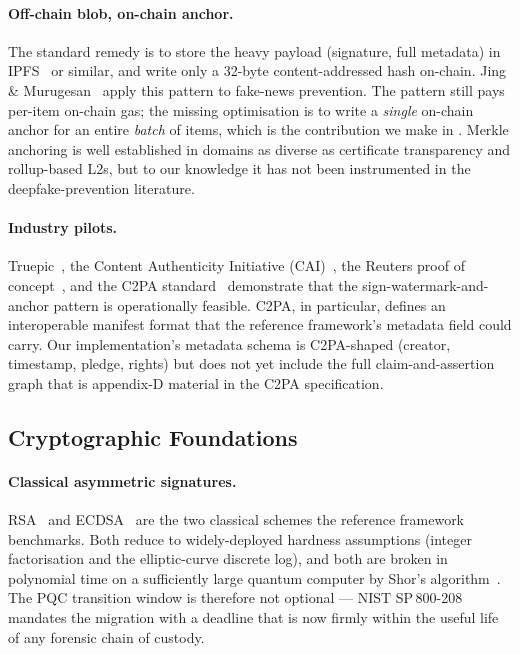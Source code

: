 \documentclass[11pt,a4paper]{article}
\theoremstyle{definition}
\theoremstyle{plain}
\theoremstyle{remark}
\begin{document}
\paragraph{Off-chain blob, on-chain anchor.}
The standard remedy is to store the heavy payload (signature, full
metadata) in IPFS~\cite{bib30} or similar, and write only a 32-byte
content-addressed hash on-chain. Jing \& Murugesan~\cite{bib13} apply
this pattern to fake-news prevention. The pattern still pays per-item
on-chain gas; the missing optimisation is to write a \emph{single}
on-chain anchor for an entire \emph{batch} of items, which is the
contribution we make in . Merkle anchoring is well
established in domains as diverse as certificate transparency and
rollup-based L2s, but to our knowledge it has not been instrumented
in the deepfake-prevention literature.

\paragraph{Industry pilots.}
Truepic~\cite{bib14}, the Content Authenticity Initiative
(CAI)~\cite{bib15}, the Reuters proof of concept~\cite{bib16}, and
the C2PA standard~\cite{bib42} demonstrate that the
sign-watermark-and-anchor pattern is operationally feasible. C2PA, in
particular, defines an interoperable manifest format that the
reference framework's metadata field could carry. Our implementation's
metadata schema is C2PA-shaped (creator, timestamp, pledge, rights)
but does not yet include the full claim-and-assertion graph that is
appendix-D material in the C2PA specification.

\subsection{Cryptographic Foundations}\label{sec:lit-crypto}

\paragraph{Classical asymmetric signatures.}
RSA~\cite{bib35} and ECDSA~\cite{bib36} are the two classical schemes
the reference framework benchmarks. Both reduce to widely-deployed
hardness assumptions (integer factorisation and the elliptic-curve
discrete log), and both are broken in polynomial time on a
sufficiently large quantum computer by Shor's
algorithm~\cite{bib34}. The PQC transition window is therefore not
optional --- NIST SP\,800-208 mandates the migration with a deadline
that is now firmly within the useful life of any forensic chain of
custody.
\end{document}
